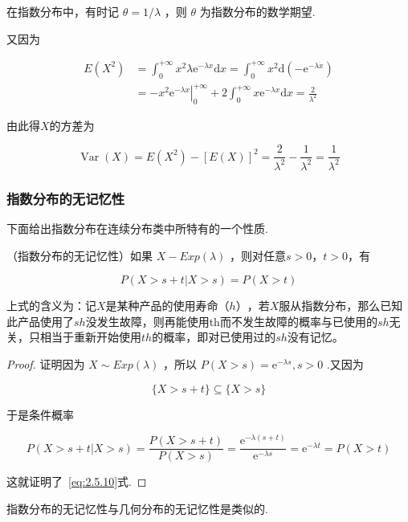 在指数分布中，有时记 $\theta=1 / \lambda$ ，则 $\theta$ 为指数分布的数学期望.

又因为

\[
\begin{aligned} E\left(X^{2}\right) &=\int_{0}^{+\infty} x^{2} \lambda \mathrm{e}^{-\lambda x} \mathrm{d} x=\int_{0}^{+\infty} x^{2} \mathrm{d}\left(-\mathrm{e}^{-\lambda x}\right) \\ &=-x^{2}\left.\mathrm{e}^{-\lambda x}\right|_{0} ^{+\infty}+2 \int_{0}^{+\infty} x \mathrm{e}^{-\lambda x} \mathrm{d} x=\frac{2}{\lambda^{2}} \end{aligned}
\]

由此得$ X $的方差为

\[
\operatorname{Var}(X)=E\left(X^{2}\right)-[E(X)]^{2}=\frac{2}{\lambda^{2}}-\frac{1}{\lambda^{2}}=\frac{1}{\lambda^{2}}
\]

\subsubsection{指数分布的无记忆性}

下面给出指数分布在连续分布类中所特有的一个性质.

\begin{theorem}
	（指数分布的无记忆性）如果 $X-E x p(\lambda)$ ，则对任意$ s>0，t>0 $，有
	
	\begin{equation}
	P(X>s+t | X>s)=P(X>t) \label{eq:2.5.10}
	\end{equation}
\end{theorem}

上式的含义为：记$ X $是某种产品的使用寿命$ （h） $，若$ X $服从指数分布，那么已知此产品使用了$ sh $没发生故障，则再能使用th而不发生故障的概率与已使用的$ sh $无关，只相当于重新开始使用$ th $的概率，即对已使用过的$ sh $没有记忆。

\begin{proof}
	证明因为 $X \sim E x p(\lambda)$ ，所以 $P(X>s)=\mathrm{e}^{-\lambda s}, s>0$ .又因为
	
	\[
	\{X>s+t\} \subseteq\{X>s\}
	\]
	
	于是条件概率
	
	\[
	P(X>s+t | X>s)=\frac{P(X>s+t)}{P(X>s)}=\frac{\mathrm{e}^{-\lambda(s+t)}}{\mathrm{e}^{-\lambda s}}=\mathrm{e}^{-\lambda t}=P(X>t)
	\]
	
	这就证明了~\ref{eq:2.5.10}式.
\end{proof}

指数分布的无记忆性与几何分布的无记忆性是类似的.

